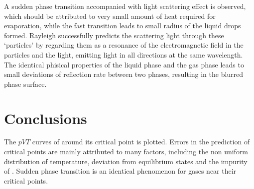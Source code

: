 \documentclass[%
 reprint,
 amsmath,amssymb,
 aps,
10.5pt,
]{revtex4-1}
\begin{document}
A sudden phase transition accompanied with light scattering effect is observed, which should be attributed to very small amount of heat required for evaporation, while the fast transition leads to small radius of the liquid drops formed. Rayleigh successfully predicts the scattering light through these `particles' by regarding them as a resonance of the electromagnetic field in the particles and the light, emitting light in all directions at the same wavelength. The identical phisical properties of the liquid phase and the gas phase leads to small deviations of reflection rate between two phases, resulting in the blurred phase surface.


\section{Conclusions}
The $pVT$ curves of  around its critical point is plotted. Errors in the prediction of critical points are mainly attributed to many factors, including the non uniform distribution of temperature, deviation from equilibrium states and the impurity of . Sudden phase transition is an identical phenomenon for gases near their critical points.
\end{document}
